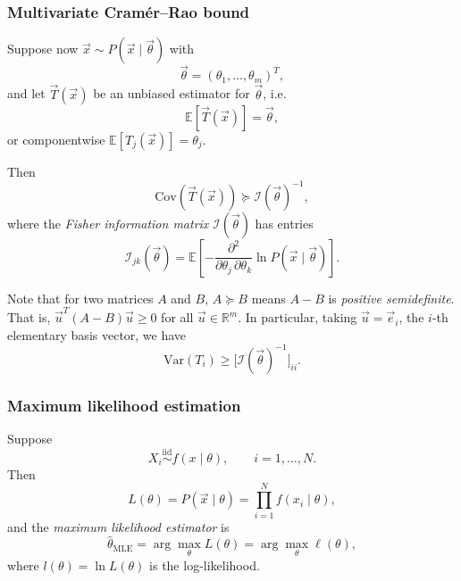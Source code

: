 \documentclass[11pt, titlepage]{article} %
\numberwithin{equation}{section}
\theoremstyle{definition}
\numberwithin{assumption}{section}
\begin{document}
\subsubsection*{Multivariate Cram\'er--Rao bound}

Suppose now $\vec x\sim P(\vec x\mid \vec \theta)$ with
\begin{equation*}
    \vec \theta=(\theta_1,\dots,\theta_m)^T,
\end{equation*}
and let $\vec T(\vec x)$ be an unbiased estimator for $\vec \theta$, i.e.
\begin{equation*}
    \mathbb{E}[\vec T(\vec x)]=\vec \theta,
\end{equation*}
or componentwise $\mathbb{E}[T_j(\vec x)]=\theta_j$.

Then
\begin{equation*}
    \mathrm{Cov}(\vec T(\vec x))\succeq \mathcal{I}(\vec \theta)^{-1},
\end{equation*}
where the \textit{Fisher information matrix} $\mathcal{I}(\vec\theta)$ has entries
\begin{equation*}
    \mathcal{I}_{jk}(\vec \theta)
    =\mathbb{E}\!\left[
    -\frac{\partial^2}{\partial \theta_j\,\partial \theta_k}
    \ln P(\vec x\mid \vec \theta)
    \right].
\end{equation*}

Note that for two matrices $A$ and $B$, $A\succeq B$ means $A-B$ is \textit{positive semidefinite}. That is, $\vec u^T(A-B)\vec u\ge 0$ for all $\vec u\in \mathbb{R}^m$. 
In particular, taking $\vec u=\vec e_i$, the $i$-th elementary basis vector, we have
\begin{equation*}
    \mathrm{Var}(T_i)\ge \bigl[\mathcal{I}(\vec \theta)^{-1}\bigr]_{ii}.
\end{equation*}

\subsubsection*{Maximum likelihood estimation}

Suppose
\begin{equation*}
    X_i \overset{\mathrm{iid}}{\sim} f(x\mid \theta), \qquad i=1,\dots,N.
\end{equation*}
Then
\begin{equation*}
    L(\theta)=P(\vec x\mid \theta)=\prod_{i=1}^N f(x_i\mid \theta),
\end{equation*}
and the \textit{maximum likelihood estimator} is
\begin{equation*}
    \hat{\theta}_{\mathrm{MLE}}
    =\arg\max_\theta L(\theta)
    =\arg\max_\theta \ell(\theta),
\end{equation*}
where $l(\theta)=\ln L(\theta)$ is the log-likelihood.
\end{document}
